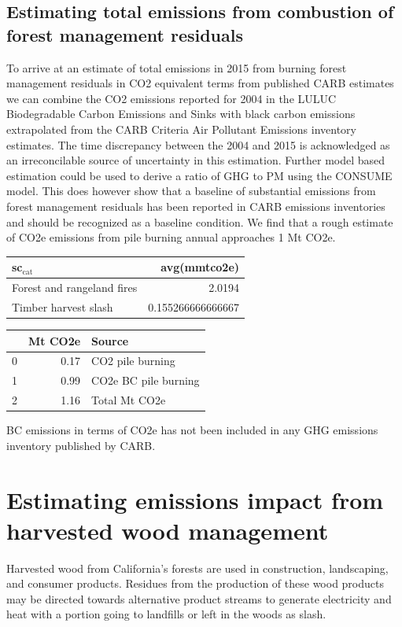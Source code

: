 \documentclass[a4paper]{article}
\begin{document}
\subsection{Estimating total emissions from combustion of forest management residuals}
\label{sec-2-2}
To arrive at an estimate of total emissions in 2015 from burning forest
management residuals in CO2 equivalent terms from published CARB
estimates we can combine the CO2 emissions reported for 2004 in the
LULUC Biodegradable Carbon Emissions and Sinks with black carbon
emissions extrapolated from the CARB Criteria Air Pollutant Emissions
inventory estimates. The time discrepancy between the 2004 and 2015 is
acknowledged as an irreconcilable source of uncertainty in this
estimation. Further model based estimation could be used to derive a
ratio of GHG to PM using the CONSUME model. This does however show that a baseline of
substantial emissions from forest management residuals has been reported
in CARB emissions inventories and should be recognized as a baseline
condition. We find that a rough estimate of CO2e emissions from pile
burning annual approaches 1 Mt CO2e.

\begin{center}
\begin{tabular}{lr}
sc$_{\text{cat}}$ & avg(mmtco2e)\\
\hline
Forest and rangeland fires & 2.0194\\
Timber harvest slash & 0.155266666666667\\
\end{tabular}
\end{center}

\begin{center}
\begin{tabular}{rrl}
 & Mt CO2e & Source\\
\hline
0 & 0.17 & CO2 pile burning\\
1 & 0.99 & CO2e BC pile burning\\
2 & 1.16 & Total Mt CO2e\\
\end{tabular}
\end{center}

BC emissions in terms of CO2e has not been included in any GHG emissions
inventory published by CARB.


\section{Estimating emissions impact from harvested wood management}
\label{sec-3}
Harvested wood from California's forests are used in construction,
landscaping, and consumer products. Residues from the
production of these wood products may be directed towards alternative product streams to generate electricity and
heat with a portion going to landfills or left in the
woods as slash.
\end{document}
